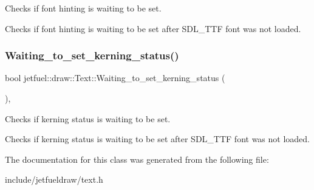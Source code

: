 Checks if font hinting is waiting to be set. 

Checks if font hinting is waiting to be set after S\+D\+L\+\_\+\+T\+TF font was not loaded. \mbox{\label{classjetfuel_1_1draw_1_1Text_ac3037b299f5e398da3c1bf52fdfa3d00}} 
\subsubsection{\texorpdfstring{Waiting\+\_\+to\+\_\+set\+\_\+kerning\+\_\+status()}{Waiting\_to\_set\_kerning\_status()}}
{\footnotesize\ttfamily bool jetfuel\+::draw\+::\+Text\+::\+Waiting\+\_\+to\+\_\+set\+\_\+kerning\+\_\+status (\begin{DoxyParamCaption}{ }\end{DoxyParamCaption})\hspace{0.3cm}{\ttfamily [inline]}, {\ttfamily [protected]}}



Checks if kerning status is waiting to be set. 

Checks if kerning status is waiting to be set after S\+D\+L\+\_\+\+T\+TF font was not loaded. 

The documentation for this class was generated from the following file\+:\begin{DoxyCompactItemize}
\item 
include/jetfueldraw/text.\+h\end{DoxyCompactItemize}
